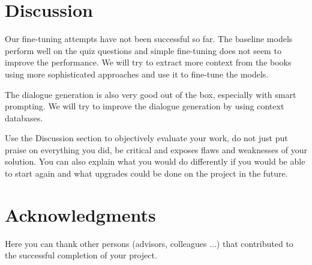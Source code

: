 \documentclass[fleqn,moreauthors,10pt]{ds_report}
\begin{document}

\section*{Discussion}

Our fine-tuning attempts have not been successful so far.
The baseline models perform well on the quiz questions and simple fine-tuning does not seem to improve the performance.
We will try to extract more context from the books using more sophisticated approaches and use it to fine-tune the models.

The dialogue generation is also very good out of the box, especially with smart prompting.
We will try to improve the dialogue generation by using context databases.



Use the Discussion section to objectively evaluate your work, do not just put praise on everything you did, be critical and exposes flaws and weaknesses of your solution. You can also explain what you would do differently if you would be able to start again and what upgrades could be done on the project in the future.



\section*{Acknowledgments}


Here you can thank other persons (advisors, colleagues ...) that contributed to the successful completion of your project.




\end{document}
